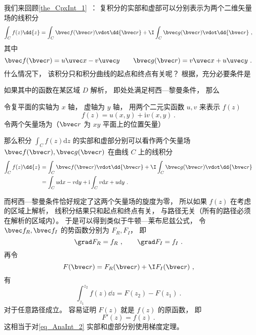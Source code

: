 
\begin{issues}
\issueDraft
\end{issues}


我们来回顾\autoref{the_CpxInt_1}~： 复积分的实部和虚部可以分别表示为两个二维矢量场的线积分
\begin{equation}
\int_{C} f(z) \dd{z} = \int_C \bvec f(\bvec r) \vdot \dd{\bvec r} + \I \int_C \bvec g(\bvec r) \vdot \dd{\bvec r}~,
\end{equation}
其中
\begin{equation}
\bvec f(\bvec r) = u\uvec x - v\uvec y
\qquad
\bvec g(\bvec r) = v\uvec x + u\uvec y~.
\end{equation}
什么情况下， 该积分只和积分曲线的起点和终点有关呢？ 根据，充分必要条件是

如果其中的函数在某区域 $D$ 解析， 即处处满足柯西—黎曼条件， 那么


\begin{theorem}{}
令复平面的实轴为 $x$ 轴， 虚轴为 $y$ 轴， 用两个二元实函数 $u, v$ 来表示 $f(z)$
\begin{equation}
f (z) = u(x, y) + \mathrm iv(x, y)~.
\end{equation}
令两个矢量场为（$\bvec r$ 为 $xy$ 平面上的位置矢量）

那么积分 $\int_{C} f(z) \mathrm{d} z$ 的实部和虚部分别可以看作两个矢量场 $\bvec f(\bvec r), \bvec g(\bvec r)$ 在曲线 $C$ 上的线积分
\begin{equation}
\begin{aligned}
\int_{C} f(z) \dd{z} &= \int_C \bvec f(\bvec r) \vdot \dd{\bvec r} + \I \int_C \bvec g(\bvec r) \vdot \dd{\bvec r}\\
&= \int_{C} u \mathrm{d} x-v \mathrm{d} y+\mathrm{i} \int_{C} v \mathrm{d} x+u \mathrm{d} y~.
\end{aligned}
\end{equation}
\end{theorem}

而柯西—黎曼条件恰好规定了这两个矢量场的旋度为零， 所以如果 $f(z)$ 在考虑的区域上解析， 线积分结果只和起点和终点有关， 与路径无关（所有的路径必须在解析的区域内）。 于是可以得到类似于牛顿—莱布尼兹公式， 令 $\bvec f_R, \bvec f_I$ 的势函数分别为 $F_R, F_I$， 即
\begin{equation}
\grad F_R = f_R~,
\qquad
\grad F_I = f_I~.
\end{equation}
再令
\begin{equation}
F(\bvec r) = F_R(\bvec r) + \I F_I(\bvec r)~,
\end{equation}
有
\begin{equation}\label{eq_AnaInt_2}
\int_{z_1}^{z_2} f(z) \dd{z} = F(z_2) - F(z_1)~.
\end{equation}
对于任意路径成立。 容易证明 $F(z)$ 就是 $f(z)$ 的原函数， 即
\begin{equation}
F'(z) = f(z)~.
\end{equation}
这相当于对\autoref{eq_AnaInt_2} 实部和虚部分别使用梯度定理。
